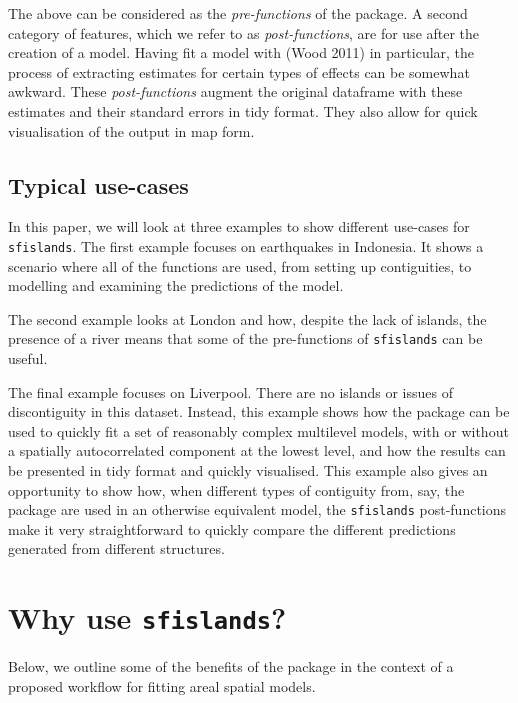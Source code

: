 The above can be considered as the \emph{pre-functions} of the package. A
second category of features, which we refer to as \emph{post-functions},
are for use after the creation of a model. Having fit a model with  (Wood 2011) in particular, the process of extracting estimates for certain types of effects can be somewhat awkward. These \emph{post-functions} augment the original dataframe with these estimates and their standard errors in tidy format. They also allow for quick visualisation of the output in map form.

\hypertarget{typical-use-cases}{%
\subsection{Typical use-cases}\label{typical-use-cases}}

In this paper, we will look at three examples to show different use-cases for
\texttt{sfislands}. The first example focuses on earthquakes in
Indonesia. It shows a scenario where all of the functions are used, from
setting up contiguities, to modelling and examining the predictions of the
model.

The second example looks at London and how, despite the lack of islands,
the presence of a river means that some of the pre-functions of
\texttt{sfislands} can be useful.

The final example focuses on Liverpool. There are no islands or issues
of discontiguity in this dataset. Instead, this example shows how the package can be used to quickly fit a set of reasonably complex multilevel models, with or without a spatially autocorrelated component at the lowest level, and how the results can be presented in tidy format and quickly visualised. This example also gives an opportunity to show how, when different types of contiguity from, say, the  package are used in an otherwise equivalent model, the \texttt{sfislands} post-functions make it very straightforward to quickly compare the different predictions generated from different structures.

\hypertarget{why-use-sfislands}{%
\section{\texorpdfstring{Why use \texttt{sfislands}?}{Why use sfislands?}}\label{why-use-sfislands}}

Below, we outline some of the benefits of the package in the context of a proposed workflow for fitting areal spatial models.

